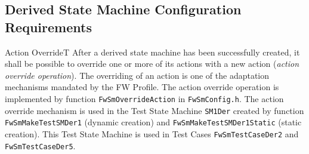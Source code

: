 \documentclass[a4paper,10pt]{article}
\newenvironment{fw_req}[6]
{\addtocounter{subsubsection}{1}
	\hspace{0.2cm}\textbf{FW-\arabic{section}.\arabic{subsection}.\arabic{subsubsection}/#2
	\hspace{0.8cm} #1}
	\vspace{-10pt}
\begin{longtable}{p{2.7cm}P{8.5cm}}
\hline
\textsc{Requirement} & #3 \\
\textsc{Justification} & #4 \\
\textsc{Implementation} & #5  \\ 
\textsc{Verification} & #6  \\
\hline
}
{\end{longtable}}
\begin{document}
\subsection{Derived State Machine Configuration Requirements}\label{req:configInterfaceDerivedSM}


\begin{fw_req}{Action Override}{T}
{After a derived state machine has been successfully created, 
it shall be possible to override one or more of its actions with a new action 
(\emph{action override operation}).}
{The overriding of an action is one of the adaptation mechanisms 
mandated by the FW Profile.}
{The action override operation is implemented by function 
\texttt{FwSmOverrideAction} in \texttt{FwSmConfig.h}.} 
{The action override mechanism is used in the Test State Machine 
\texttt{SM1Der} created by function 
\texttt{FwSmMakeTestSMDer1} (dynamic creation) and \texttt{FwSmMakeTestSMDer1Static} (static 
creation). 
This Test State Machine is used in Test Cases \texttt{FwSmTestCaseDer2} and
\texttt{FwSmTestCaseDer5}.}
\end{fw_req}
\end{document}
